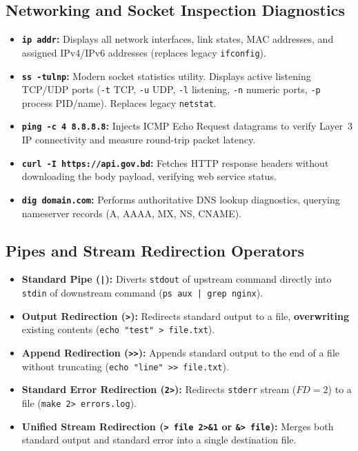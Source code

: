 \subsection{Networking and Socket Inspection Diagnostics}
\begin{itemize}[leftmargin=*]
    \item \textbf{\texttt{ip addr}:} Displays all network interfaces, link states, MAC addresses, and assigned IPv4/IPv6 addresses (replaces legacy \texttt{ifconfig}).
    \item \textbf{\texttt{ss -tulnp}:} Modern socket statistics utility. Displays active listening TCP/UDP ports (\texttt{-t} TCP, \texttt{-u} UDP, \texttt{-l} listening, \texttt{-n} numeric ports, \texttt{-p} process PID/name). Replaces legacy \texttt{netstat}.
    \item \textbf{\texttt{ping -c 4 8.8.8.8}:} Injects ICMP Echo Request datagrams to verify Layer~3 IP connectivity and measure round-trip packet latency.
    \item \textbf{\texttt{curl -I https://api.gov.bd}:} Fetches HTTP response headers without downloading the body payload, verifying web service status.
    \item \textbf{\texttt{dig domain.com}:} Performs authoritative DNS lookup diagnostics, querying nameserver records (A, AAAA, MX, NS, CNAME).
\end{itemize}

\subsection{Pipes and Stream Redirection Operators}
\begin{itemize}[leftmargin=*]
    \item \textbf{Standard Pipe (\texttt{|}):} Diverts \texttt{stdout} of upstream command directly into \texttt{stdin} of downstream command (\texttt{ps aux | grep nginx}).
    \item \textbf{Output Redirection (\texttt{>}):} Redirects standard output to a file, \textbf{overwriting} existing contents (\texttt{echo "test" > file.txt}).
    \item \textbf{Append Redirection (\texttt{>>}):} Appends standard output to the end of a file without truncating (\texttt{echo "line" >> file.txt}).
    \item \textbf{Standard Error Redirection (\texttt{2>}):} Redirects \texttt{stderr} stream ($FD=2$) to a file (\texttt{make 2> errors.log}).
    \item \textbf{Unified Stream Redirection (\texttt{> file 2>\&1} or \texttt{\&> file}):} Merges both standard output and standard error into a single destination file.
\end{itemize}

